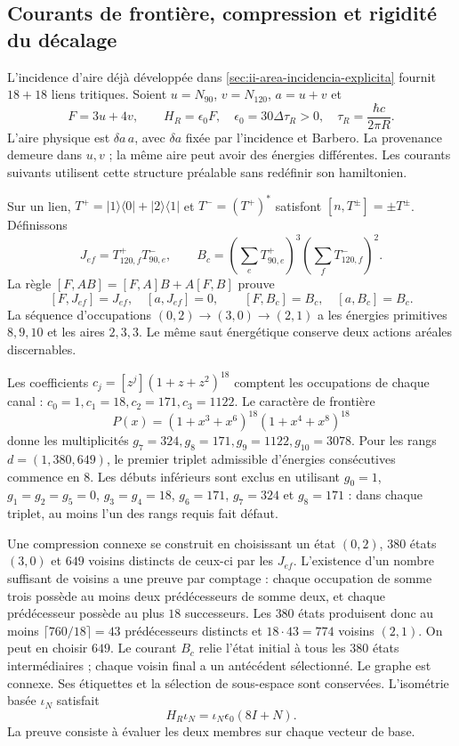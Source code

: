 \subsection{Courants de frontière, compression et rigidité du décalage}
\label{sec:ii-ter27-corrientes}

L’incidence d’aire déjà développée dans \ref{sec:ii-area-incidencia-explicita}
fournit $18+18$ liens tritiques. Soient $u=N_{90}$, $v=N_{120}$,
$a=u+v$ et
\[
 F=3u+4v,\qquad H_R=\epsilon_0 F,
 \quad\epsilon_0=30\Delta\tau_R>0,
 \quad\tau_R=\frac{\hbar c}{2\pi R}.
\]
L’aire physique est $\delta a\,a$, avec $\delta a$ fixée par l’incidence
et Barbero. La provenance demeure dans $u,v$ ; la même aire peut avoir
des énergies différentes. Les courants suivants utilisent cette structure
préalable sans redéfinir son hamiltonien.

Sur un lien, $T^+=|1\rangle\langle0|+|2\rangle\langle1|$ et
$T^-=(T^+)^*$ satisfont $[n,T^\pm]=\pm T^\pm$. Définissons
\[
 J_{ef}=T^+_{120,f}T^-_{90,e},\qquad
 B_c=\left(\sum_eT^+_{90,e}\right)^3
     \left(\sum_fT^-_{120,f}\right)^2.
\]
La règle $[F,AB]=[F,A]B+A[F,B]$ prouve
\[
 [F,J_{ef}]=J_{ef},\quad[a,J_{ef}]=0,
 \qquad[F,B_c]=B_c,\quad[a,B_c]=B_c.
\]
La séquence d’occupations $(0,2)\to(3,0)\to(2,1)$ a les énergies
primitives $8,9,10$ et les aires $2,3,3$. Le même saut énergétique conserve
deux actions aréales discernables.

Les coefficients $c_j=[z^j](1+z+z^2)^{18}$ comptent les occupations de
chaque canal : $c_0=1,c_1=18,c_2=171,c_3=1122$. Le caractère de frontière
\[
 P(x)=(1+x^3+x^6)^{18}(1+x^4+x^8)^{18}
\]
donne les multiplicités $g_7=324,g_8=171,g_9=1122,g_{10}=3078$.
Pour les rangs $d=(1,380,649)$, le premier triplet admissible d’énergies
consécutives commence en $8$. Les débuts inférieurs sont exclus en utilisant
$g_0=1$, $g_1=g_2=g_5=0$, $g_3=g_4=18$, $g_6=171$, $g_7=324$ et
$g_8=171$ : dans chaque triplet, au moins l’un des rangs requis fait défaut.

Une compression connexe se construit en choisissant un état $(0,2)$,
$380$ états $(3,0)$ et $649$ voisins distincts de ceux-ci par les $J_{ef}$.
L’existence d’un nombre suffisant de voisins a une preuve par comptage : chaque
occupation de somme trois possède au moins deux prédécesseurs de somme deux, et
chaque prédécesseur possède au plus $18$ successeurs. Les $380$ états
produisent donc au moins $\lceil760/18\rceil=43$ prédécesseurs
distincts et $18\cdot43=774$ voisins $(2,1)$. On peut en choisir $649$.
Le courant $B_c$ relie l’état initial à tous les $380$ états
intermédiaires ; chaque voisin final a un antécédent sélectionné. Le graphe
est connexe. Ses étiquettes et la sélection de sous-espace sont conservées.
L’isométrie basée $\iota_N$ satisfait
\begin{equation}
 H_R\iota_N=\iota_N\epsilon_0(8I+N).
 \label{eq:ii-ter27-compresion}
\end{equation}
La preuve consiste à évaluer les deux membres sur chaque vecteur de base.

